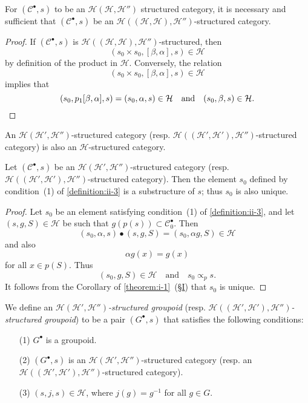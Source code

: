 \documentclass[a4paper,fleqn]{article}
\theoremstyle{plain}
\newenvironment{proposition}[1]
  {\renewcommand\theinnerproposition{#1}\innerproposition}
  {\endinnerproposition}
\theoremstyle{definition}
\newenvironment{definition}[1]
  {\renewcommand\theinnerdefinition{#1}\innerdefinition}
  {\endinnerdefinition}
\newcommand{\oldpage}[1]{{\marginpar{\footnotesize$\bigg\vert$\,\,\,\,\textit{p.~#1}}}}
\newcommand{\textand}{\quad\text{and}\quad}
\newcommand{\CC}{\mathcal{C}}
\newcommand{\HH}{\mathcal{H}}
\newcommand{\subs}{\mathrel{\propto}}
\begin{document}
\begin{proposition}{5}
\label{proposition:ii-5}
  For $(\CC^\bullet,s)$ to be an $\HH(\HH,\HH'')$ structured category, it is necessary and sufficient that $(\CC^\bullet,s)$ be an $\HH((\HH,\HH),\HH'')$-structured category.
\end{proposition}

\begin{proof}
  If $(\CC^\bullet,s)$ is $\HH((\HH,\HH),\HH'')$-structured, then
  \[
    (s_0\times s_0,[\beta,\alpha],s)
    \in\HH
  \]
  by definition of the product in $\HH$.
  Conversely, the relation
  \[
    (s_0\times s_0,[\beta,\alpha],s)
    \in\HH
  \]
  implies that
  \[
    (s_0,p_1[\beta,\alpha],s)
    = (s_0,\alpha,s)\in\HH
    \textand
    (s_0,\beta,s)
    \in\HH.
    \qedhere
  \]
\end{proof}

An $\HH(\HH',\HH'')$-structured category (resp. $\HH((\HH',\HH'),\HH'')$-structured category) is also an $\HH$-structured category.

\begin{proposition}{6}
\label{proposition:ii-6}
  Let $(\CC^\bullet,s)$ be an $\HH(\HH',\HH'')$-structured category (resp. $\HH((\HH',\HH'),\HH'')$-structured category).
  Then the element $s_0$ defined by condition~(1) of \cref{definition:ii-3} is a substructure of $s$; thus $s_0$ is also unique.
\end{proposition}

\begin{proof}
  \oldpage{384}
  Let $s_0$ be an element satisfying condition~(1) of \cref{definition:ii-3}, and let $(s,g,S)\in\HH$ be such that $g(p(s))\subset\CC_0^\bullet$.
  Then
  \[
    (s_0,\alpha,s)\bullet(s,g,S)
    = (s_0,\alpha g,S)\in\HH
  \]
  and also
  \[
    \alpha g(x)
    = g(x)
  \]
  for all $x\in p(S)$.
  Thus
  \[
    (s_0,g,S)\in\HH
    \textand
    s_0\subs_p s.
  \]
  It follows from the Corollary of \cref{theorem:i-1}~(\hyperref[section:i]{§I}) that $s_0$ is unique.
\end{proof}

\begin{definition}{4}
\label{definition:ii-4}
  We define an \emph{$\HH(\HH',\HH'')$-structured groupoid} (resp. \emph{$\HH((\HH',\HH'),\HH'')$-structured groupoid}) to be a pair $(G^\bullet,s)$ that satisfies the following conditions:
  \begin{enumerate}
    \item[\normalfont(1)]
      $G^\bullet$ is a groupoid.

    \item[\normalfont(2)]
      $(G^\bullet,s)$ is an $\HH(\HH',\HH'')$-structured category (resp. an $\HH((\HH',\HH'),\HH'')$-structured category).

    \item[\normalfont(3)]
      $(s,j,s)\in\HH$, where $j(g)=g^{-1}$ for all $g\in G$.
  \end{enumerate}
\end{definition}
\end{document}
